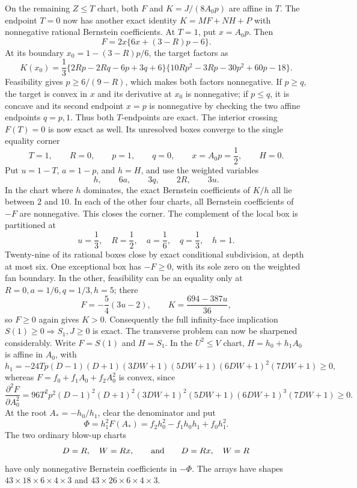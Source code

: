 \documentclass[11pt]{article}
\theoremstyle{remark}
\begin{document}
On the remaining \(Z\leq T\) chart, both \(F\) and
\(K=J/(8A_0p)\) are affine in \(T\).  The endpoint \(T=0\) now has another
exact identity \(K=MF+NH+P\) with nonnegative rational Bernstein
coefficients.  At \(T=1\), put \(x=A_0p\).  Then
\[
 F=2x\{6x+(3-R)p-6\}.
\]
At its boundary \(x_0=1-(3-R)p/6\), the target factors as
\[
 K(x_0)=\frac13
 \{2Rp-2Rq-6p+3q+6\}
 \{10Rp^2-3Rp-30p^2+60p-18\}.
\]
Feasibility gives \(p\geq6/(9-R)\), which makes both factors
nonnegative.  If \(p\geq q\), the target is convex in \(x\) and its
derivative at \(x_0\) is nonnegative; if \(p\leq q\), it is concave and
its second endpoint \(x=p\) is nonnegative by checking the two affine
endpoints \(q=p,1\).  Thus both \(T\)-endpoints are exact.  The interior crossing
\(F(T)=0\) is now exact as well.  Its unresolved boxes converge to the
single equality corner
\[
 T=1,\qquad R=0,\qquad p=1,\qquad q=0,\qquad
 x=A_0p=\frac12,\qquad H=0.
\]
Put \(u=1-T\), \(a=1-p\), and \(h=H\), and use the weighted variables
\[
                         h,\qquad 6a,\qquad3q,\qquad2R,\qquad3u.
\]
In the chart where \(h\) dominates, the exact Bernstein coefficients of
\(K/h\) all lie between $2$ and $10$.  In each of the other four
charts, all Bernstein coefficients of \(-F\) are nonnegative.  This closes
the corner.  The complement of the local box is partitioned at
\[
 u=\frac13,\quad R=\frac12,\quad a=\frac16,\quad
 q=\frac13,\quad h=1.
\]
Twenty-nine of its rational boxes close by exact conditional subdivision,
at depth at most six.  One exceptional box has \(-F\geq0\), with its sole
zero on the weighted fan boundary.  In the other, feasibility can be an
equality only at
\(R=0,a=1/6,q=1/3,h=5\); there
\[
 F=-\frac54(3u-2),\qquad K=\frac{694-387u}{36},
\]
so $F\geq0$ again gives $K>0$.  Consequently the full infinity-face
implication $S(1)\geq0\Rightarrow S_1,J\geq0$ is exact.  The transverse
problem can now be sharpened considerably.  Write $F=S(1)$ and $H=S_1$.
In the $U^2\leq V$ chart, $H=h_0+h_1A_0$ is affine in $A_0$, with
\[
 h_1=-24Tp(D-1)(D+1)(3DW+1)(5DW+1)(6DW+1)^2(7DW+1)\geq0,
\]
whereas $F=f_0+f_1A_0+f_2A_0^2$ is convex, since
\[
 \frac{\partial^2F}{\partial A_0^2}
 =96T^2p^2(D-1)^2(D+1)^2(3DW+1)^2
 (5DW+1)(6DW+1)^3(7DW+1)\geq0.
\]
At the root $A_*=-h_0/h_1$, clear the denominator and put
\[
 \Phi=h_1^2F(A_*)=f_2h_0^2-f_1h_0h_1+f_0h_1^2.
\]
The two ordinary blow-up charts
\[
 D=R,\quad W=Rx,\qquad\hbox{and}\qquad D=Rx,\quad W=R
\]
have only nonnegative Bernstein coefficients in $-\Phi$. The arrays have
shapes $43\mathbin\times18\mathbin\times6\mathbin\times4\mathbin\times3$
and $43\mathbin\times26\mathbin\times6\mathbin\times4\mathbin\times3$.
\end{document}
